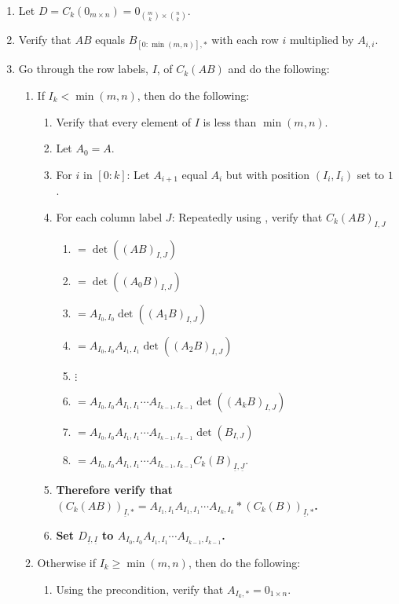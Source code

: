 \documentclass[twocolumn]{article}
\newcommand{\ul}[1]{\underline{#1}}
\newcommand{\procedurehr}[2][]{\hyperref[sec:procedure #2]{\ifthenelse{\equal{#1}{}}{procedure #2}{#1}}}
\begin{document}
				\begin{enumerate}
					\item Let $D=C_k(0_{m\times n})=0_{\binom{m}{k}\times\binom{n}{k}}$.
					\item Verify that $AB$ equals $B_{[0:\min(m,n)],*}$ with each row $i$ multiplied by $A_{i,i}$.
					\item Go through the row labels, $I$, of $C_k(AB)$ and do the following:
					\begin{enumerate}
						\item If $I_k<\min(m,n)$, then do the following:
						\begin{enumerate}
							\item Verify that every element of $I$ is less than $\min(m,n)$.
							\item Let $A_0=A$.
							\item For $i$ in $[0:k]$: Let $A_{i+1}$ equal $A_{i}$ but with position $(I_i,I_i)$ set to $1$.
							\item For each column label $J$: Repeatedly using \procedurehr{3.12}, verify that ${C_k(AB)}_{I,J}$
							\begin{enumerate}
								\item $=\det((AB)_{I,J})$
								\item $=\det((A_0B)_{I,J})$
								\item $=A_{I_0,I_0}\det((A_1B)_{I,J})$
								\item $=A_{I_0,I_0}A_{I_1,I_1}\det((A_2B)_{I,J})$
								\item $\vdots$
								\item $=A_{I_0,I_0}A_{I_1,I_1}\cdots A_{I_{k-1},I_{k-1}}\det((A_kB)_{I,J})$
								\item $=A_{I_0,I_0}A_{I_1,I_1}\cdots A_{I_{k-1},I_{k-1}}\det(B_{I,J})$
								\item $=A_{I_0,I_0}A_{I_1,I_1}\cdots A_{I_{k-1},I_{k-1}}{C_k(B)}_{\ul{I},\ul{J}}$.
							\end{enumerate}
							\item \textbf{Therefore verify that $(C_k(AB))_{\ul{I},*}=A_{I_1,I_1}A_{I_1,I_1}\cdots A_{I_k,I_k}*(C_k(B))_{\ul{I},*}$.}
							\item \textbf{Set $D_{\ul{I},\ul{I}}$ to $A_{I_0,I_0}A_{I_1,I_1}\cdots A_{I_{k-1},I_{k-1}}$.}
						\end{enumerate}
						\item Otherwise if $I_k\ge\min(m,n)$, then do the following:
						\begin{enumerate}
							\item Using the precondition, verify that $A_{I_k,*}=0_{1\times n}$.

\end{enumerate}
\end{enumerate}
\end{enumerate}
\end{document}
